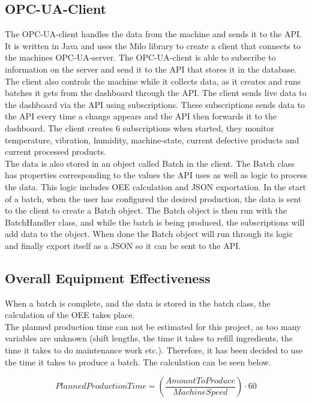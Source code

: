 \subsection{OPC-UA-Client}
The OPC-UA-client handles the data from the machine and sends it to the API. It 
is written in Java and uses the Milo library to create a client that connects to 
the machines OPC-UA-server. The OPC-UA-client is able to subscribe to 
information on the server and send it to the API that stores it in the database.
The client also controls the machine while it collects data, as it creates and
runs batches it gets from the dashboard through the API. The client sends live
data to the dashboard via the API using subscriptions. These subscriptions sends
data to the API every time a change appears and the API then forwards it to the
dashboard. The client creates 6 subscriptions when started, they monitor
temperature, vibration, humidity, machine-state,  current defective products and
current processed products. \\

The data is also stored in an object called Batch in the client. The Batch class
has properties corresponding to the values the API uses as well as logic to
process the data. This logic includes OEE calculation and JSON exportation. In
the start of a batch, when the user has configured the desired production, the
data is sent to the client to create a Batch object. The Batch object is then
run with the BatchHandler class, and while the batch is being produced, the
subscriptions will add data to the object. When done the Batch object will run
through its logic and finally export itself as a JSON so it can be sent to the
API. 


\subsection{Overall Equipment Effectiveness}
When a batch is complete, and the data is stored in the batch class, the
calculation of the OEE takes place.\\

The planned production time can not be estimated for this project, as too many
variables are unknown (shift lengths, the time it takes to refill ingredients,
the time it takes to do maintenance work etc.). Therefore, it has been decided
to use the time it takes to produce a batch. The calculation can be seen
below.

\[PlannedProductionTime = \left(\frac{AmountToProduce}{MachineSpeed}\right)\cdot60\]\\

